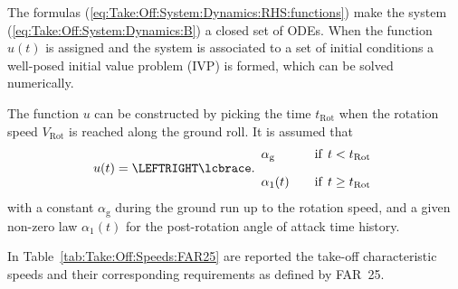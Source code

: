 \documentclass[12pt,twoside]{book}
\begin{document}
The formulas (\ref{eq:Take:Off:System:Dynamics:RHS:functions}) make the system (\ref{eq:Take:Off:System:Dynamics:B})
a closed set of ODEs.
When the function $u(t)$ is assigned and the system is associated to a set of initial conditions a well-posed
initial value problem (IVP) is formed, which can be solved numerically.

The function $u$ can be constructed by picking the time $t_{\text{Rot}}$ when the rotation speed $V_{\text{Rot}}$ 
is reached along the ground roll. It is assumed that
\begin{equation}\label{eq:Take:Off:System:Dynamics:Alpha:Law}
u (t) =
    \LEFTRIGHT\lcbrace.{
      \begin{array}{l@{\rule{2em}{0pt}}l} 
        \alpha_{\text{g}}
          & \text{if} \;\, t < t_{\text{Rot}}
        \\[1em]
        \alpha_1(t)
          & \text{if} \;\, t \geq t_{\text{Rot}}
      \end{array}
    }
\end{equation}
%
with a constant $\alpha_{\text{g}}$ during the ground run up to the rotation speed,
and a given non-zero law $\alpha_1(t)$ for the post-rotation angle of attack time history.

In Table~\ref{tab:Take:Off:Speeds:FAR25} are reported the take-off characteristic speeds and their
corresponding requirements as defined by FAR~25.
\end{document}
